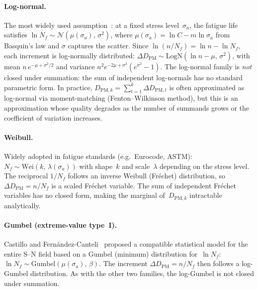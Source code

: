\documentclass[11pt,a4paper]{article}
\theoremstyle{plain}
\theoremstyle{definition}
\theoremstyle{remark}
\begin{document}
\paragraph{Log-normal.}
The most widely used assumption~\cite{MunizCalvente2022}: at a fixed stress level~$\sigma_a$, the fatigue life satisfies $\ln N_f \sim \mathcal{N}(\mu(\sigma_a),\,\sigma^2)$, where $\mu(\sigma_a) = \ln C - m\ln\sigma_a$ from Basquin's law and $\sigma$ captures the scatter.
Since $\ln(n/N_f) = \ln n - \ln N_f$, each increment is log-normally distributed: $\Delta D_{\mathrm{PM}} \sim \mathrm{LogN}(\ln n - \mu,\,\sigma^2)$, with mean $n\,e^{-\mu + \sigma^2/2}$ and variance $n^2 e^{-2\mu+\sigma^2}(e^{\sigma^2}-1)$.
The log-normal family is \emph{not} closed under summation: the sum of independent log-normals has no standard parametric form.
In practice, $D_{\mathrm{PM},k} = \sum_{t=1}^{k}\Delta D_{\mathrm{PM},t}$ is often approximated as log-normal via moment-matching (Fenton--Wilkinson method), but this is an approximation whose quality degrades as the number of summands grows or the coefficient of variation increases.

\paragraph{Weibull.}
Widely adopted in fatigue standards (e.g.\ Eurocode, ASTM): $N_f \sim \mathrm{Wei}(k,\,\lambda(\sigma_a))$ with shape~$k$ and scale~$\lambda$ depending on the stress level.
The reciprocal $1/N_f$ follows an inverse Weibull (Fr\'echet) distribution, so $\Delta D_{\mathrm{PM}} = n/N_f$ is a scaled Fr\'echet variable.
The sum of independent Fr\'echet variables has no closed form, making the marginal of~$D_{\mathrm{PM},k}$ intractable analytically.

\paragraph{Gumbel (extreme-value type~I).}
Castillo and Fern\'andez-Canteli~\cite{CastilloFernandezCanteli2009} proposed a compatible statistical model for the entire S--N field based on a Gumbel (minimum) distribution for~$\ln N_f$: $\ln N_f \sim \mathrm{Gumbel}(\mu(\sigma_a),\,\beta)$.
The increment $\Delta D_{\mathrm{PM}} = n/N_f$ then follows a log-Gumbel distribution.
As with the other two families, the log-Gumbel is not closed under summation.
\end{document}
